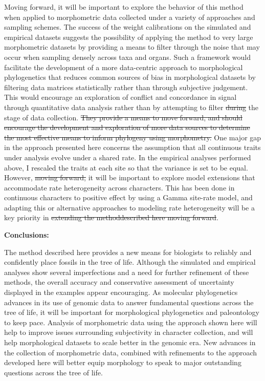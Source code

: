 \documentclass[12pt]{article}
\providecommand{\DIFadd}[1]{{\protect\color{blue}\uwave{#1}}} %
\providecommand{\DIFdel}[1]{{\protect\color{red}\sout{#1}}}                      %
\providecommand{\DIFaddbegin}{} %
\providecommand{\DIFaddend}{} %
\providecommand{\DIFdelbegin}{} %
\providecommand{\DIFdelend}{} %
\newcommand{\DIFscaledelfig}{0.5}
\newlength{\DIFdelgraphicswidth} %
\newlength{\DIFdelgraphicsheight} %
\newcommand{\DIFaddincludegraphics}[2][]{{\color{blue}\fbox{\DIFOincludegraphics[#1]{#2}}}} %
\newcommand{\DIFdelincludegraphics}[2][]{%
\sbox{\DIFdelgraphicsbox}{\DIFOincludegraphics[#1]{#2}}%
\settoboxwidth{\DIFdelgraphicswidth}{\DIFdelgraphicsbox} %
\settoboxtotalheight{\DIFdelgraphicsheight}{\DIFdelgraphicsbox} %
\scalebox{\DIFscaledelfig}{%
\parbox[b]{\DIFdelgraphicswidth}{\usebox{\DIFdelgraphicsbox}\\[-\baselineskip] \rule{\DIFdelgraphicswidth}{0em}}\llap{\resizebox{\DIFdelgraphicswidth}{\DIFdelgraphicsheight}{%
\setlength{\unitlength}{\DIFdelgraphicswidth}%
\begin{picture}(1,1)%
\thicklines\linethickness{2pt} %
{\color[rgb]{1,0,0}\put(0,0){\framebox(1,1){}}}%
{\color[rgb]{1,0,0}\put(0,0){\line( 1,1){1}}}%
{\color[rgb]{1,0,0}\put(0,1){\line(1,-1){1}}}%
\end{picture}%
}\hspace*{3pt}}} %
} %
\DeclareRobustCommand{\DIFaddbegin}{\DIFOaddbegin \let\includegraphics\DIFaddincludegraphics} %
\DeclareRobustCommand{\DIFaddend}{\DIFOaddend \let\includegraphics\DIFOincludegraphics} %
\DeclareRobustCommand{\DIFdelbegin}{\DIFOdelbegin \let\includegraphics\DIFdelincludegraphics} %
\DeclareRobustCommand{\DIFdelend}{\DIFOaddend \let\includegraphics\DIFOincludegraphics} %
\begin{document}
Moving forward, it will be important to explore the behavior of this
method when applied to morphometric data collected under a variety of
approaches and sampling schemes. The success of the weight calibrations
on the simulated and empirical datasets suggests the possibility of
applying the method to very large morphometric datasets by providing a
means to filter through the noise that may occur when  sampling
densely across taxa and organs. Such a framework would facilitate the
development of a more data-centric approach to morphological
phylogenetics that reduces common sources of bias in morphological 
datasets by filtering data matrices statistically rather than through subjective judgement.
 This would encourage an exploration of conflict and
concordance in signal through quantitative data analysis rather than by
attempting to filter \DIFdelbegin \DIFdel{during }\DIFdelend \DIFaddbegin \DIFadd{subjectively at }\DIFaddend the stage of data collection. \DIFdelbegin \DIFdel{They provide
a means to move forward, and should encourage the development and
exploration of more data sources to determine the most effective means
to inform phylogeny using morphometry. }\DIFdelend One major gap in the approach 
presented here concerns the assumption that all continuous traits under
analysis evolve under a shared rate. In the empirical analyses performed 
above, I rescaled the traits at each 
site so that the variance is set to be equal. However, \DIFdelbegin \DIFdel{moving forward, }\DIFdelend it 
will be important to explore model extensions that accommodate rate
heterogeneity across characters. This has been done in continuous characters
to positive effect by \cite{schraiber2013inferring} using a Gamma site-rate
model, and adapting this or alternative approaches to modeling rate 
heterogeneity \citep{huelsenbeck2007nonparametric} will be a key 
priority in \DIFdelbegin \DIFdel{extending the methoddescribed here moving forward}\DIFdelend \DIFaddbegin \DIFadd{future extensions the method}\DIFaddend .


\noindent\textbf{Conclusions:}

The method described here provides a new means for biologists to
reliably and confidently place fossils in the tree of life. Although the
simulated and empirical analyses show several imperfections and a need
for further refinement of these methods, the overall accuracy and
conservative assessment of uncertainty displayed in the examples appear
encouraging. As molecular phylogenetics advances in its use of genomic
data to answer fundamental questions across the tree of life, it will be
important for morphological phylogenetics and paleontology to keep pace.
Analysis of morphometric data using the approach shown here will help to
improve issues surrounding subjectivity in character collection, and
will help morphological datasets to scale better in the genomic era. New
advances in the collection of morphometric data, combined with
refinements to the approach developed here will better equip morphology
to speak to major outstanding questions across the tree of life.
\end{document}
